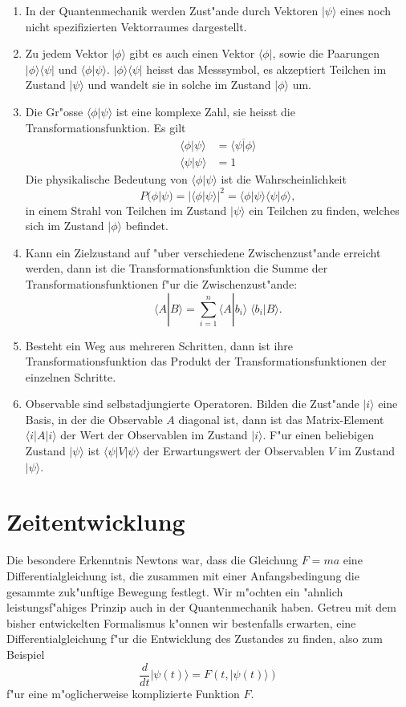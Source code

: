 \begin{enumerate}
\item
In der Quantenmechanik werden Zust"ande durch Vektoren $|\psi\rangle$
eines noch nicht spezifizierten Vektorraumes dargestellt.
\item
Zu jedem Vektor $|\phi\rangle$ gibt es auch einen Vektor $\langle \phi|$,
sowie die Paarungen
$|\phi\rangle\langle\psi|$
und
$\langle\phi|\psi\rangle$.
$|\phi\rangle\langle\psi|$ heisst das Messsymbol, es akzeptiert Teilchen im
Zustand $|\psi\rangle$ und wandelt sie in solche im Zustand $|\phi\rangle$
um.
\item
Die Gr"osse $\langle \phi|\psi\rangle$ ist eine komplexe Zahl, sie
heisst die Transformationsfunktion. Es gilt
\begin{align*}
\langle \phi|\psi\rangle
&=
\overline{
\langle \psi|\phi\rangle
}
\\
\langle\psi|\psi\rangle&=1
\end{align*}
Die physikalische Bedeutung von $\langle\phi|\psi\rangle$ ist die
Wahrscheinlichkeit
\[
P(\phi|\psi)=|\langle \phi|\psi\rangle|^2=
\langle\phi|\psi\rangle
\langle\psi|\phi\rangle,
\]
in einem Strahl von Teilchen im Zustand $|\psi\rangle$ ein Teilchen zu
finden, welches sich im Zustand $|\phi\rangle$ befindet.
\item Kann ein Zielzustand auf "uber verschiedene Zwischenzust"ande
erreicht werden, dann ist die Transformationsfunktion die Summe
der Transformationsfunktionen f"ur die Zwischenzust"ande:
\[
\langle A|B\rangle
=
\sum_{i=1}^n\langle A|b_i\rangle\;\langle b_i|B\rangle.
\]
\item
Besteht ein Weg aus mehreren Schritten, dann ist ihre Transformationsfunktion
das Produkt der Transformationsfunktionen der einzelnen Schritte.
\item 
Observable sind selbstadjungierte Operatoren.
Bilden die Zust"ande $|i\rangle$ eine Basis, in der die Observable $A$ 
diagonal ist, dann ist das Matrix-Element $\langle i|A|i\rangle$ der
Wert der Observablen im Zustand $|i\rangle$. F"ur einen beliebigen
Zustand $|\psi\rangle$ ist $\langle\psi|V|\psi\rangle$ der Erwartungswert
der Observablen $V$ im Zustand $|\psi\rangle$.
\end{enumerate}

%
%
\section{Zeitentwicklung}
Die besondere Erkenntnis Newtons war, dass die Gleichung $F=ma$ eine
Differentialgleichung ist, die zusammen mit einer Anfangsbedingung die
gesammte zuk"unftige Bewegung festlegt.
Wir m"ochten ein "ahnlich leistungsf"ahiges Prinzip auch in der
Quantenmechanik haben.
Getreu mit dem bisher entwickelten Formalismus k"onnen wir bestenfalls
erwarten, eine Differentialgleichung f"ur die Entwicklung des Zustandes
zu finden, also zum Beispiel
\begin{equation}
\frac{d}{dt}|\psi(t)\rangle = F(t, |\psi(t)\rangle)
\label{zeitentwicklung}
\end{equation}
f"ur eine m"oglicherweise komplizierte Funktion $F$.

